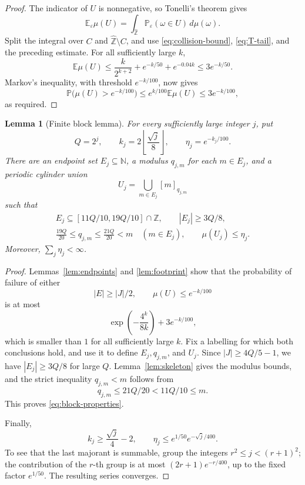 \documentclass[11pt]{article}
\numberwithin{equation}{section}
\newtheorem{lemma}[theorem]{Lemma}
\theoremstyle{definition}
\theoremstyle{remark}
\newcommand{\N}{\mathbb N}
\newcommand{\Z}{\mathbb Z}
\newcommand{\Pp}{\mathbb P}
\newcommand{\E}{\mathbb E}
\newcommand{\Zh}{\widehat{\mathbb Z}}
\begin{document}
\begin{proof}
The indicator of \(U\) is nonnegative, so Tonelli's theorem gives
\[
 \E_{\varepsilon}\mu(U)
 =\int_{\Zh}\Pp_{\varepsilon}(\omega\in U)\,d\mu(\omega).
\]
Split the integral over \(C\) and \(\Zh\setminus C\), and use
\eqref{eq:collision-bound}, \eqref{eq:T-tail}, and the preceding estimate.
For all sufficiently large \(k\),
\[
 \E\mu(U)
 \le\frac{k}{2^{k+2}}+e^{-k/50}+e^{-0.04k}
 \le3e^{-k/50}.
\]
Markov's inequality, with threshold \(e^{-k/100}\), now gives
\[
 \Pp\bigl(\mu(U)>e^{-k/100}\bigr)
 \le e^{k/100}\E\mu(U)
 \le3e^{-k/100},
\]
as required.
\end{proof}

\begin{lemma}[Finite block lemma]\label{lem:block}
For every sufficiently large integer \(j\), put
\[
 Q=2^j,\qquad
 k_j=2\left\lfloor\frac{\sqrt j}{8}\right\rfloor,\qquad
 \eta_j=e^{-k_j/100}.
\]
There are an endpoint set \(E_j\subseteq\N\), a modulus \(q_{j,m}\) for
each \(m\in E_j\), and a periodic cylinder union
\[
 U_j=\bigcup_{m\in E_j}[m]_{q_{j,m}}
\]
such that
\begin{equation}\label{eq:block-properties}
\begin{gathered}
 E_j\subseteq[11Q/10,19Q/10]\cap\Z,\qquad |E_j|\ge3Q/8,\\
 \frac{19Q}{20}\le q_{j,m}\le\frac{21Q}{20}<m
 \quad(m\in E_j),\qquad
 \mu(U_j)\le\eta_j .
\end{gathered}
\end{equation}
Moreover, \(\sum_j\eta_j<\infty\).
\end{lemma}

\begin{proof}
Lemmas~\ref{lem:endpoints} and \ref{lem:footprint} show that the probability
of failure of either
\[
 |E|\ge|J|/2,\qquad \mu(U)\le e^{-k/100}
\]
is at most
\[
 \exp\left(-\frac{4^k}{8k}\right)+3e^{-k/100},
\]
which is smaller than \(1\) for all sufficiently large \(k\).  Fix a
labelling for which both conclusions hold, and use it to define
\(E_j,q_{j,m}\), and \(U_j\).  Since \(|J|\ge4Q/5-1\), we have
\(|E_j|\ge3Q/8\) for large \(Q\).  Lemma~\ref{lem:skeleton} gives the
modulus bounds, and the strict inequality \(q_{j,m}<m\) follows from
\[
 q_{j,m}\le21Q/20<11Q/10\le m.
\]
This proves \eqref{eq:block-properties}.

Finally,
\[
 k_j\ge\frac{\sqrt j}{4}-2,
 \qquad
 \eta_j\le e^{1/50}e^{-\sqrt j/400}.
\]
To see that the last majorant is summable, group the integers
\(r^2\le j<(r+1)^2\); the contribution of the \(r\)-th group is at most
\((2r+1)e^{-r/400}\), up to the fixed factor \(e^{1/50}\).  The resulting
series converges.
\end{proof}
\end{document}
